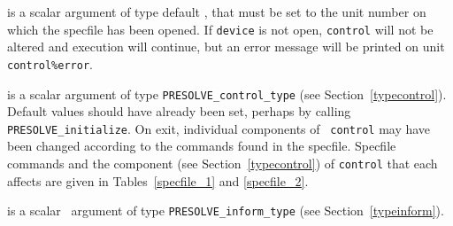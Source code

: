 \documentclass{galahad}
\newcommand{\packagename}{PRESOLVE}
\begin{document}
\begin{description}
 is a scalar \intentin argument of type default \integer,
that must be set to the unit number on which the specfile
has been opened. If {\tt device} is not open, {\tt control} will
not be altered and execution will continue, but an error message
will be printed on unit {\tt control\%error}.

 is a scalar \intentinout argument of type 
{\tt \packagename\_control\_type} (see Section~\ref{typecontrol}). 
Default values should have already been set, perhaps by calling 
{\tt \packagename\_initialize}. On exit, individual components of {\tt
control} may have been changed according to the commands found in the
specfile. Specfile commands and  the component (see Section~\ref{typecontrol})
of {\tt control}  that each affects are given in
Tables~\ref{specfile_1} and \ref{specfile_2}.

 is a scalar \intentout\ argument of type 
{\tt \packagename\_inform\_type} (see Section~\ref{typeinform}).
\end{description}
\end{document}
